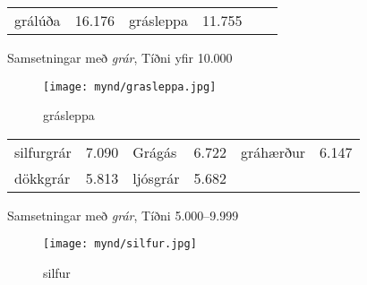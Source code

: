 \documentclass[../samsetningasafn.tex]{subfiles}
\begin{document}
\begin{wordlist}[H]
\begin{tcolorbox}

	\setlength{\extrarowheight}{3pt} 
	\begin{tabular}{BlBlBl}
		grálúða		& 16.176		& 		
		grásleppa	& 11.755		& 		
					&
	\end{tabular}

\end{tcolorbox}
	\caption{Samsetningar með \textit{grár}, Tíðni yfir 10.000}
	\label{listi:gratt.10000}
\end{wordlist}	

\begin{figure}[H]
\begin{tcolorbox}
\centering
	\texttt{[image: mynd/grasleppa.jpg]}
\end{tcolorbox}
	\caption{grásleppa}
	\label{mynd:grasleppa}
\end{figure}
		
\begin{wordlist}[H]
\begin{tcolorbox}

	\setlength{\extrarowheight}{3pt}
	\begin{tabular}{BlBlBl}		
		silfurgrár	& 7.090		& 	
		Grágás		& 6.722		& 		
		gráhærður	& 6.147		\\   	
		dökkgrár	& 5.813		& 		
		ljósgrár		& 5.682		& 		
					&
	\end{tabular}

\end{tcolorbox}
	\caption{Samsetningar með \textit{grár}, Tíðni 5.000--9.999}
	\label{listi:gratt.5000}
\end{wordlist}

\begin{figure}[H]
\begin{tcolorbox}
\centering
	\texttt{[image: mynd/silfur.jpg]}
\end{tcolorbox}
	\caption{silfur}
	\label{mynd:silfur}
\end{figure}
		
\end{document}
